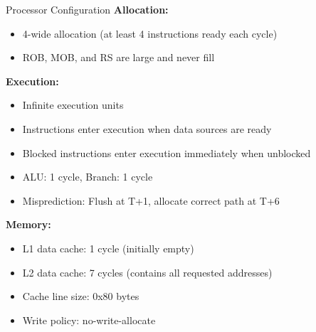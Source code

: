 \documentclass[aspectratio=169,12pt]{beamer}
\begin{document}
\begin{frame}{Processor Configuration}
\textbf{Allocation:}
\begin{itemize}
    \item 4-wide allocation (at least 4 instructions ready each cycle)
    \item ROB, MOB, and RS are large and never fill
\end{itemize}

\textbf{Execution:}
\begin{itemize}
    \item Infinite execution units
    \item Instructions enter execution when data sources are ready
    \item Blocked instructions enter execution immediately when unblocked
    \item ALU: 1 cycle, Branch: 1 cycle
    \item Misprediction: Flush at T+1, allocate correct path at T+6
\end{itemize}

\textbf{Memory:}
\begin{itemize}
    \item L1 data cache: 1 cycle (initially empty)
    \item L2 data cache: 7 cycles (contains all requested addresses)
    \item Cache line size: 0x80 bytes
    \item Write policy: no-write-allocate
\end{itemize}
\end{frame}
\end{document}
